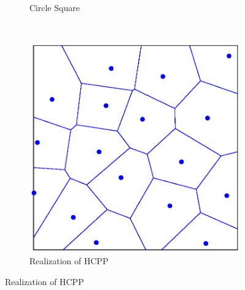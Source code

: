 \documentclass[slidestop,usepdftitle=false]{gvvslides}
\begin{document}
\begin{frame}
\begin{figure}
\begin{subfigure}{0.33\columnwidth}
\caption{Circle Square }
\end{subfigure}~
\begin{subfigure}{0.33\columnwidth}
\includegraphics[width=\columnwidth]{c4_deploy_hcpp}
\caption{Realization of HCPP}
\end{subfigure}
\end{figure}
\end{frame}
\end{document}
